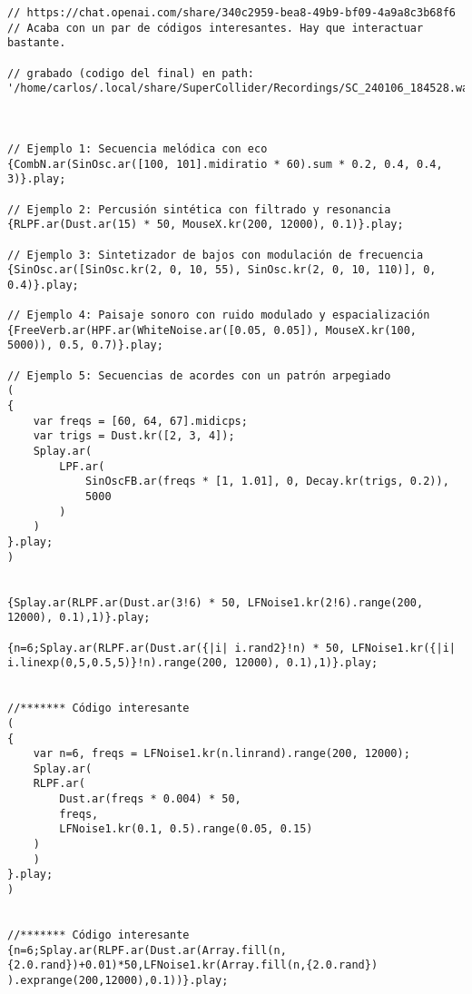 \begin{minipage}[t]{1\textwidth}
    \centering
    \begin{lstlisting}[style=SuperCollider-IDE, basicstyle=\footnotesize\ttfamily, numbers=none]
// https://chat.openai.com/share/340c2959-bea8-49b9-bf09-4a9a8c3b68f6
// Acaba con un par de códigos interesantes. Hay que interactuar bastante.

// grabado (codigo del final) en path: '/home/carlos/.local/share/SuperCollider/Recordings/SC_240106_184528.wav'



// Ejemplo 1: Secuencia melódica con eco
{CombN.ar(SinOsc.ar([100, 101].midiratio * 60).sum * 0.2, 0.4, 0.4, 3)}.play;

// Ejemplo 2: Percusión sintética con filtrado y resonancia
{RLPF.ar(Dust.ar(15) * 50, MouseX.kr(200, 12000), 0.1)}.play;

// Ejemplo 3: Sintetizador de bajos con modulación de frecuencia
{SinOsc.ar([SinOsc.kr(2, 0, 10, 55), SinOsc.kr(2, 0, 10, 110)], 0, 0.4)}.play;

// Ejemplo 4: Paisaje sonoro con ruido modulado y espacialización
{FreeVerb.ar(HPF.ar(WhiteNoise.ar([0.05, 0.05]), MouseX.kr(100, 5000)), 0.5, 0.7)}.play;

// Ejemplo 5: Secuencias de acordes con un patrón arpegiado
(
{
    var freqs = [60, 64, 67].midicps;
    var trigs = Dust.kr([2, 3, 4]);
    Splay.ar(
        LPF.ar(
            SinOscFB.ar(freqs * [1, 1.01], 0, Decay.kr(trigs, 0.2)),
            5000
        )
    )
}.play;
)


{Splay.ar(RLPF.ar(Dust.ar(3!6) * 50, LFNoise1.kr(2!6).range(200, 12000), 0.1),1)}.play;

{n=6;Splay.ar(RLPF.ar(Dust.ar({|i| i.rand2}!n) * 50, LFNoise1.kr({|i| i.linexp(0,5,0.5,5)}!n).range(200, 12000), 0.1),1)}.play;


//******* Código interesante
(
{
    var n=6, freqs = LFNoise1.kr(n.linrand).range(200, 12000);
    Splay.ar(
    RLPF.ar(
        Dust.ar(freqs * 0.004) * 50,
        freqs,
        LFNoise1.kr(0.1, 0.5).range(0.05, 0.15)
    )
    )
}.play;
)


//******* Código interesante
{n=6;Splay.ar(RLPF.ar(Dust.ar(Array.fill(n,{2.0.rand})+0.01)*50,LFNoise1.kr(Array.fill(n,{2.0.rand})  ).exprange(200,12000),0.1))}.play;                                      
    \end{lstlisting}
    \vspace{1cm}
\end{minipage}
